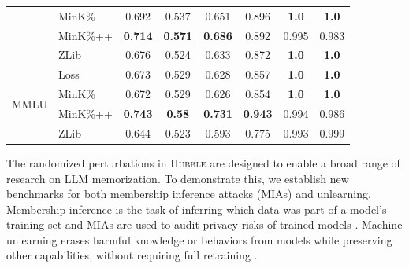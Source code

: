 \documentclass{article} %
\begin{document}
\begin{table}[tb]
\begin{tabular}{clcccccc}
                                    & MinK\%                                                      &   0.692       &   0.537      &  0.651       &   0.896       &   \textbf{1.0}       &  \textbf{1.0}           \\  
                                    & MinK\%++                                                    &   \textbf{0.714}       &   \textbf{0.571}      &  \textbf{0.686}       &   0.892       &   0.995       &  0.983           \\  
                                    & ZLib                                                        &   0.676       &   0.524      &  0.633       &   0.872       &   \textbf{1.0}       &  \textbf{1.0}           \\
\midrule
\multirow{4}{*}{MMLU}                & Loss                                                        &   0.673       &   0.529      &  0.628       &   0.857       &   \textbf{1.0}       &  \textbf{1.0}           \\  
                                    & MinK\%                                                      &   0.672       &   0.529      &  0.626       &   0.854       &   \textbf{1.0}       &  \textbf{1.0}           \\  
                                    & MinK\%++                                                    &   \textbf{0.743}       &   \textbf{0.58}      &  \textbf{0.731}       &   \textbf{0.943}       &   0.994       &  0.986           \\  
                                    & ZLib                                                        &   0.644       &   0.523      &  0.593       &   0.775       &   0.993       &  0.999           \\
\bottomrule
\end{tabular}
\end{table}


The randomized perturbations in \textsc{Hubble} are designed to enable a broad range of research on LLM memorization. To demonstrate this, we establish new benchmarks for both membership inference attacks (MIAs) and unlearning. Membership inference is the task of inferring which data was part of a  model's training set and MIAs are used to audit privacy risks of trained models  \citep{shokri2017membershipinferenceattacksmachine}. Machine unlearning erases  harmful knowledge or behaviors from models while preserving other capabilities, without requiring full retraining \citep{bourtoule_2021_machine, llm_unlearning}.
\end{document}
